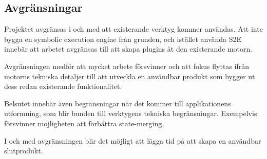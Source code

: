 \subsection{Avgränsningar} 

Projektet avgränsas i och med att existerande verktyg kommer användas. Att 
inte bygga en symbolic execution engine från grunden, och istället använda 
S2E innebär att arbetet avgränsas till att skapa plugins åt den existerande 
motorn. 

Avgränsningen medför att mycket arbete försvinner och att fokus flyttas 
ifrån motorns tekniska detaljer till att utveckla en användbar produkt som 
bygger ut dess redan existerande funktionalitet.

Belsutet innebär även begränsningar när det kommer till applikationens 
utformning, som blir bunden till verktygens tekniska begränsningar. 
Exempelvis försvinner möjligheten att förbättra state-merging. 

I och med avgränsningen blir det möjligt att lägga tid på att skapa en 
användbar slutprodukt.


